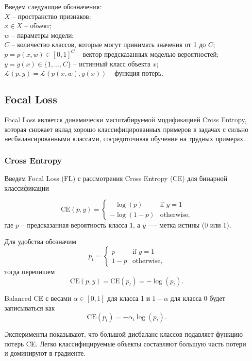 Введем следующие обозначения:
\\\indent $X$ -- пространство признаков;
\\\indent $x \in X$ -- объект;
\\\indent $w$ -- параметры модели;
\\\indent $C$ -- количество классов, которые могут принимать значения от 1 до $C$;
\\\indent $p=p(x,w) \in [0, 1]^C$ -- вектор предсказанных моделью вероятностей;
\\\indent $y=y(x) \in \{1,\ldots,C\}$ -- истинный класс объекта $x$;
\\\indent $\mathcal{L}(p,y) = \mathcal{L}(p(x, w), y(x))$ -- функция потерь.

\subsection*{Focal Loss}

Focal Loss является динамически масштабируемой модификацией Cross Entropy, которая снижает вклад хорошо классифицированных примеров в задачах с сильно несбалансированными классами, сосредоточивая обучение на трудных примерах.

\subsubsection*{Cross Entropy}

Введем Focal Loss (FL) с рассмотрения Cross Entropy (CE) для бинарной классификации

\[ 
    \text{CE}(p, y) = \begin{cases}
        -\log(p) & \text{if } y=1 \\
        -\log(1-p) & \text{otherwise,}
    \end{cases}
\] 
где $p$ -- предсказанная вероятность класса 1, а $y$ —- метка истины (0 или 1).

Для удобства обозначим
\[
    p_t = \begin{cases}
        p & \text{if } y=1 \\
        1-p & \text{otherwise,}
    \end{cases}
\]
тогда перепишем
\[
    \text{CE}(p, y) = \text{CE}(p_t) = -\log(p_t).
\]
 
Balanced CE с весами $\alpha\in[0,1]$ для класса 1 и $1-\alpha$ для класса 0 будет записываться как
\[
    \text{CE}(p_t) = -\alpha_t\log(p_t).
\]

Эксперименты показывают, что большой дисбаланс классов подавляет функцию потерь CE. Легко классифицируемые объекты составляют большую часть потери и доминируют в градиенте.

